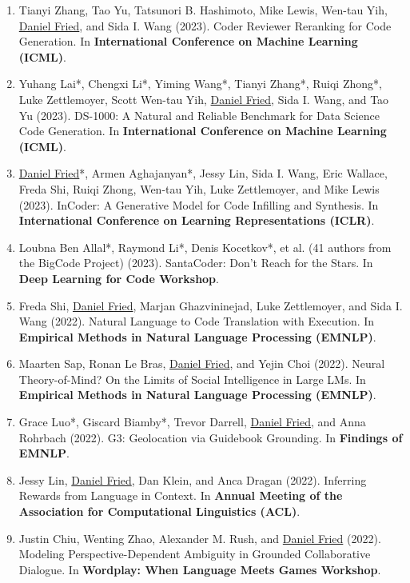 \begin{enumerate}[leftmargin=-1mm,partopsep=0pt]
\item Tianyi Zhang, Tao Yu, Tatsunori B. Hashimoto, Mike Lewis, Wen-tau Yih, \underline{Daniel Fried}, and Sida I. Wang (2023). Coder Reviewer Reranking for Code Generation. In \textbf{International Conference on Machine Learning (ICML)}.

\item Yuhang Lai*, Chengxi Li*, Yiming Wang*, Tianyi Zhang*, Ruiqi Zhong*, Luke Zettlemoyer, Scott Wen-tau Yih, \underline{Daniel Fried}, Sida I. Wang, and Tao Yu (2023). {DS-1000}: A Natural and Reliable Benchmark for Data Science Code Generation. In \textbf{International Conference on Machine Learning (ICML)}.

\item \underline{Daniel Fried}*, Armen Aghajanyan*, Jessy Lin, Sida I. Wang, Eric Wallace, Freda Shi, Ruiqi Zhong, Wen-tau Yih, Luke Zettlemoyer, and Mike Lewis (2023). {InCoder}: A Generative Model for Code Infilling and Synthesis. In \textbf{International Conference on Learning Representations (ICLR)}.

\item Loubna Ben Allal*, Raymond Li*, Denis Kocetkov*, et al. (41 authors from the BigCode Project) (2023). {SantaCoder}: Don't Reach for the Stars. In \textbf{Deep Learning for Code Workshop}.

\item Freda Shi, \underline{Daniel Fried}, Marjan Ghazvininejad, Luke Zettlemoyer, and Sida I. Wang (2022). Natural Language to Code Translation with Execution. In \textbf{Empirical Methods in Natural Language Processing (EMNLP)}.

\item Maarten Sap, Ronan Le Bras, \underline{Daniel Fried}, and Yejin Choi  (2022). Neural Theory-of-Mind? On the Limits of Social Intelligence in Large LMs. In \textbf{Empirical Methods in Natural Language Processing (EMNLP)}.

\item Grace Luo*, Giscard Biamby*, Trevor Darrell, \underline{Daniel Fried}, and Anna Rohrbach (2022). G3: Geolocation via Guidebook Grounding. In \textbf{Findings of EMNLP}.

\item Jessy Lin, \underline{Daniel Fried}, Dan Klein, and Anca Dragan (2022). Inferring Rewards from Language in Context. In \textbf{Annual Meeting of the Association for Computational Linguistics (ACL)}.

\item Justin Chiu, Wenting Zhao, Alexander M. Rush, and \underline{Daniel Fried} (2022). Modeling Perspective-Dependent Ambiguity in Grounded Collaborative Dialogue. In \textbf{Wordplay: When Language Meets Games Workshop}.


\end{enumerate}
